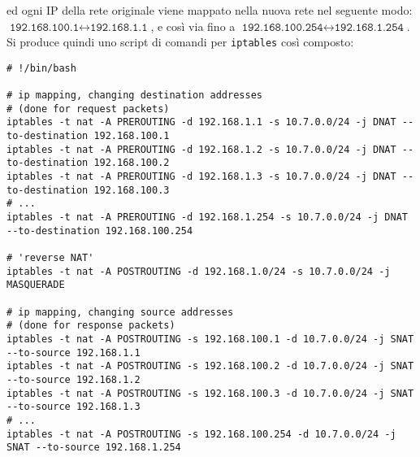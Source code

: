 ed ogni IP della rete originale viene mappato nella nuova rete nel seguente
modo: $\texttt{192.168.100.1} \leftrightarrow \texttt{192.168.1.1}$, e così via
fino a $\texttt{192.168.100.254} \leftrightarrow \texttt{192.168.1.254}$.
Si produce quindi uno script di comandi per \texttt{iptables} così composto:
\begin{verbatim}
# !/bin/bash

# ip mapping, changing destination addresses
# (done for request packets)
iptables -t nat -A PREROUTING -d 192.168.1.1 -s 10.7.0.0/24 -j DNAT --to-destination 192.168.100.1
iptables -t nat -A PREROUTING -d 192.168.1.2 -s 10.7.0.0/24 -j DNAT --to-destination 192.168.100.2
iptables -t nat -A PREROUTING -d 192.168.1.3 -s 10.7.0.0/24 -j DNAT --to-destination 192.168.100.3
# ...
iptables -t nat -A PREROUTING -d 192.168.1.254 -s 10.7.0.0/24 -j DNAT --to-destination 192.168.100.254

# 'reverse NAT'
iptables -t nat -A POSTROUTING -d 192.168.1.0/24 -s 10.7.0.0/24 -j MASQUERADE

# ip mapping, changing source addresses
# (done for response packets)
iptables -t nat -A POSTROUTING -s 192.168.100.1 -d 10.7.0.0/24 -j SNAT --to-source 192.168.1.1
iptables -t nat -A POSTROUTING -s 192.168.100.2 -d 10.7.0.0/24 -j SNAT --to-source 192.168.1.2
iptables -t nat -A POSTROUTING -s 192.168.100.3 -d 10.7.0.0/24 -j SNAT --to-source 192.168.1.3
# ...
iptables -t nat -A POSTROUTING -s 192.168.100.254 -d 10.7.0.0/24 -j SNAT --to-source 192.168.1.254
\end{verbatim}
